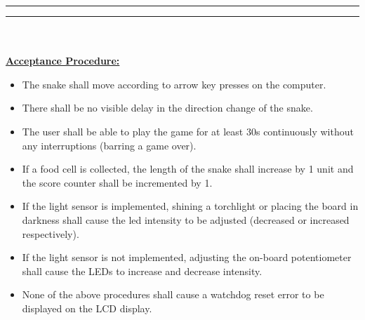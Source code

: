 \documentclass[11pt]{article}
\newcommand{\question}[2] {
    \noindent \begin{minipage}{\textwidth}
        \vspace{.25in} \hrule\vspace{0.5em}
        \noindent{\bf #1: #2} \vspace{0.5em}
        \hrule \vspace{.10in}
    \end{minipage} \\ \\
}
\newcommand{\linespace} {\vspace{\baselineskip}}
\begin{document}
 \linespace \linespace

\question{Part 9}{Acceptance Test Plan}
    \noindent \textbf{\underline{Acceptance Procedure:}}
    \begin{itemize}[noitemsep]
        \item The snake shall move according to arrow key presses on the computer.
        \item There shall be no visible delay in the direction change of the snake.
        \item The user shall be able to play the game for at least 30s continuously without any interruptions (barring a game over).
        \item If a food cell is collected, the length of the snake shall increase by 1 unit and the score counter shall be incremented by 1.
        \item If the light sensor is implemented, shining a torchlight or placing the board in darkness shall cause the led intensity to be adjusted (decreased or increased respectively).
        \item If the light sensor is not implemented, adjusting the on-board potentiometer shall cause the LEDs to increase and decrease intensity.
        \item None of the above procedures shall cause a watchdog reset error to be displayed on the LCD display.
    \end{itemize}
\end{document}
